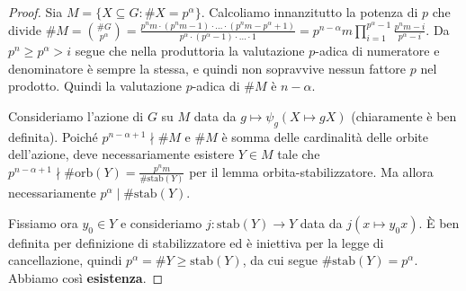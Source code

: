 \begin{proof}
    Sia $M = \{ X \subseteq G : \#X = p^{\alpha}\}$.  Calcoliamo innanzitutto la potenza di $p$ che divide $\#M = \binom{\#G}{p^{\alpha}} = \frac{p^nm \cdot (p^nm-1) \cdot \dots \cdot (p^nm - p^{\alpha} +1)}{p^{\alpha}\cdot(p^{\alpha}-1)\cdot \dots \cdot 1} = p^{n-\alpha}m \prod_{i=1}^{p^{\alpha}-1} \frac{p^nm-i}{p^{\alpha}-i}$. Da $p^n \geq p^{\alpha} > i$ segue che nella produttoria la valutazione $p$-adica di numeratore e denominatore è sempre la stessa, e quindi non sopravvive nessun fattore $p$ nel prodotto. Quindi la valutazione $p$-adica di $\#M$ è $n-\alpha$.
    
    Consideriamo l'azione di $G$ su $M$ data da $g\mapsto \psi_g(X \mapsto gX)$ (chiaramente è ben definita). Poiché $p^{n-\alpha +1} \nmid \#M$ e $\#M$ è somma delle cardinalità delle orbite dell'azione, deve necessariamente esistere $Y \in M$ tale che $p^{n-\alpha +1} \nmid \#\text{orb}(Y) = \frac{p^nm}{\#\text{stab}(Y)}$ per il lemma orbita-stabilizzatore. Ma allora necessariamente $p^{\alpha} \mid \#\text{stab}(Y)$.
    
    Fissiamo ora $y_0 \in Y$ e consideriamo $j: \text{stab}(Y) \rightarrow Y$ data da $j(x \mapsto y_0x)$. È ben definita per definizione di stabilizzatore ed è iniettiva per la legge di cancellazione, quindi $p^{\alpha} = \#Y \geq \text{stab}(Y)$, da cui segue $\#\text{stab}(Y) = p^{\alpha}$. Abbiamo così \textbf{esistenza}.
    

\end{proof}
